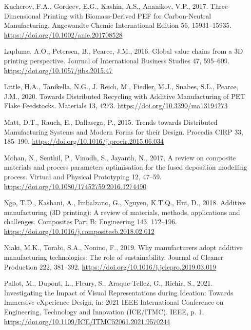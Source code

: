 \documentclass[
  11pt,
]{article}
\newlength{\cslhangindent}
\newlength{\cslentryspacingunit} %
\newenvironment{CSLReferences}[2] %
 {%
  \setlength{\parindent}{0pt}
  \ifodd #1
  \let\oldpar\par
  \def\par{\hangindent=\cslhangindent\oldpar}
  \fi
  \setlength{\parskip}{#2\cslentryspacingunit}
 }%
 {}
\begin{document}
\begin{CSLReferences}{1}{0}
\leavevmode{}%
Kucherov, F.A., Gordeev, E.G., Kashin, A.S., Ananikov, V.P., 2017.
Three-{Dimensional Printing} with {Biomass-Derived PEF} for
{Carbon-Neutral Manufacturing}. Angewandte Chemie International Edition
56, 15931--15935. \url{https://doi.org/10.1002/anie.201708528}

\leavevmode{}%
Laplume, A.O., Petersen, B., Pearce, J.M., 2016. Global value chains
from a {3D} printing perspective. Journal of International Business
Studies 47, 595--609. \url{https://doi.org/10.1057/jibs.2015.47}

\leavevmode{}%
Little, H.A., Tanikella, N.G., J. Reich, M., Fiedler, M.J., Snabes,
S.L., Pearce, J.M., 2020. Towards {Distributed Recycling} with {Additive
Manufacturing} of {PET Flake Feedstocks}. Materials 13, 4273.
\url{https://doi.org/10.3390/ma13194273}

\leavevmode{}%
Matt, D.T., Rauch, E., Dallasega, P., 2015. Trends towards {Distributed
Manufacturing Systems} and {Modern Forms} for their {Design}. Procedia
CIRP 33, 185--190. \url{https://doi.org/10.1016/j.procir.2015.06.034}

\leavevmode{}%
Mohan, N., Senthil, P., Vinodh, S., Jayanth, N., 2017. A review on
composite materials and process parameters optimisation for the fused
deposition modelling process. Virtual and Physical Prototyping 12,
47--59. \url{https://doi.org/10.1080/17452759.2016.1274490}

\leavevmode{}%
Ngo, T.D., Kashani, A., Imbalzano, G., Nguyen, K.T.Q., Hui, D., 2018.
Additive manufacturing ({3D} printing): {A} review of materials,
methods, applications and challenges. Composites Part B: Engineering
143, 172--196. \url{https://doi.org/10.1016/j.compositesb.2018.02.012}

\leavevmode{}%
Niaki, M.K., Torabi, S.A., Nonino, F., 2019. Why manufacturers adopt
additive manufacturing technologies: {The} role of sustainability.
Journal of Cleaner Production 222, 381--392.
\url{https://doi.org/10.1016/j.jclepro.2019.03.019}

\leavevmode{}%
Pallot, M., Dupont, L., Fleury, S., Araque-Tellez, G., Richir, S., 2021.
Investigating the {Impact} of {Visual Representations} during
{Ideation}: {Towards Immersive eXperience Design}, in: 2021 {IEEE
International Conference} on {Engineering}, {Technology} and
{Innovation} ({ICE}/{ITMC}). {IEEE}, p. 1.
\url{https://doi.org/10.1109/ICE/ITMC52061.2021.9570244}


\end{CSLReferences}
\end{document}
